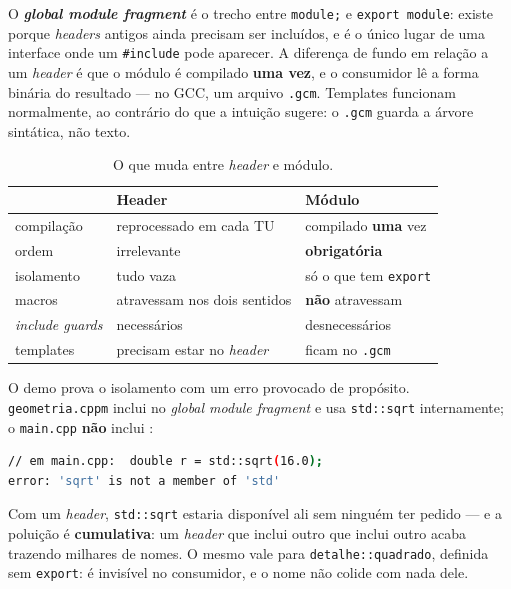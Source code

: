 O \textbf{\emph{global module fragment}} é o trecho entre \texttt{module;} e
\texttt{export module}: existe porque \emph{headers} antigos ainda precisam ser
incluídos, e é o único lugar de uma interface onde um \texttt{\#include} pode
aparecer. A diferença de fundo em relação a um \emph{header} é que o módulo é
compilado \textbf{uma vez}, e o consumidor lê a forma binária do resultado ---
no GCC, um arquivo \texttt{.gcm}. Templates funcionam normalmente, ao contrário
do que a intuição sugere: o \texttt{.gcm} guarda a árvore sintática, não texto.

\begin{table}[htbp]
\centering
\caption{O que muda entre \emph{header} e módulo.}
\label{tab:header-modulo}
\footnotesize
\begin{tabular}{@{}lll@{}}
\toprule
 & \textbf{Header} & \textbf{Módulo} \\
\midrule
compilação            & reprocessado em cada TU         & compilado \textbf{uma} vez \\
ordem                 & irrelevante                     & \textbf{obrigatória} \\
isolamento            & tudo vaza                       & só o que tem \texttt{export} \\
macros                & atravessam nos dois sentidos    & \textbf{não} atravessam \\
\emph{include guards} & necessários                     & desnecessários \\
templates             & precisam estar no \emph{header} & ficam no \texttt{.gcm} \\
\bottomrule
\end{tabular}
\end{table}

O demo prova o isolamento com um erro provocado de propósito.
\texttt{geometria.cppm} inclui  no \emph{global module
fragment} e usa \texttt{std::sqrt} internamente; o \texttt{main.cpp}
\textbf{não} inclui :

\begin{lstlisting}[style=bt, language=bash,
    caption={Medição em \texttt{src/modules/}: o \texttt{\#include} do módulo
             não atravessa o \texttt{import}.}]
// em main.cpp:  double r = std::sqrt(16.0);
error: 'sqrt' is not a member of 'std'
\end{lstlisting}

Com um \emph{header}, \texttt{std::sqrt} estaria disponível ali sem ninguém ter
pedido --- e a poluição é \textbf{cumulativa}: um \emph{header} que inclui outro
que inclui outro acaba trazendo milhares de nomes. O mesmo vale para
\texttt{detalhe::quadrado}, definida sem \texttt{export}: é invisível no
consumidor, e o nome não colide com nada dele.

